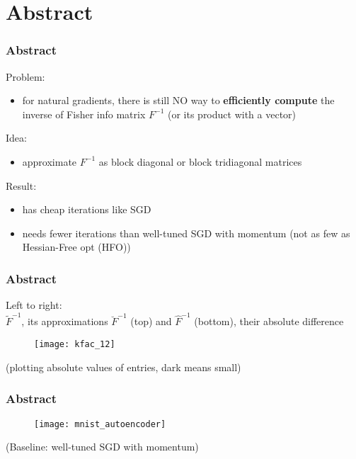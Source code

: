 \section{Abstract}

\begin{frame}
\frametitle{Abstract}

Problem:
\begin{itemize}
    \item for natural gradients, there is still NO way to \textbf{efficiently compute}
        the inverse of Fisher info matrix $F^{-1}$ (or its product with a vector)
\end{itemize}

Idea:
\begin{itemize}
    \item approximate $F^{-1}$ as block diagonal or block tridiagonal matrices
\end{itemize}

Result:
\begin{itemize}
    \item has cheap iterations like SGD
    \item needs fewer iterations than well-tuned SGD with momentum
        (not as few as Hessian-Free opt (HFO))
\end{itemize}

\end{frame}

\begin{frame}
\frametitle{Abstract}
{\footnotesize
Left to right: \\
$\tilde{F}^{-1}$, its approximations $\breve{F}^{-1}$ (top) and $\hat{F}^{-1}$ (bottom), their absolute difference
}
\begin{figure}
    \centering
    \texttt{[image: kfac\_12]}
\end{figure}
(plotting absolute values of entries, dark means small)
\end{frame}

\begin{frame}
\frametitle{Abstract}
\begin{figure}
    \centering
    \texttt{[image: mnist\_autoencoder]}
\end{figure}
(Baseline: well-tuned SGD with momentum)
\end{frame}

